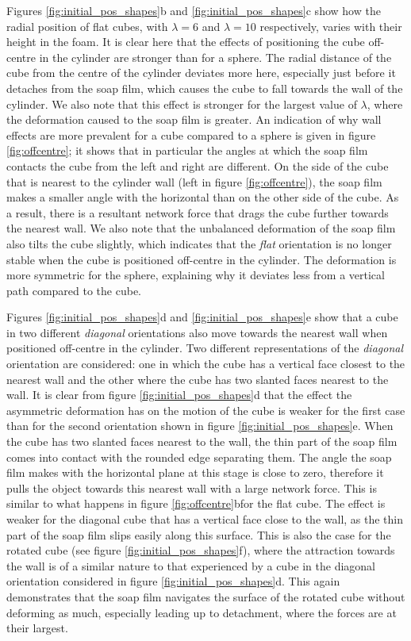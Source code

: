 \documentclass[preprint]{revtex4-1}
\begin{document}
Figures \ref{fig:initial_pos_shapes}b and \ref{fig:initial_pos_shapes}c show how the radial position of flat cubes, with $\lambda=6$ and $\lambda=10$ respectively, varies with their height in the foam. It is clear here that the effects of positioning the cube off-centre in the cylinder are stronger than for a sphere. The radial distance of the cube from the centre of the cylinder deviates more here, especially just before it detaches from the soap film, which causes the cube to fall towards the wall of the cylinder. We also note that this effect is stronger for the largest value of $\lambda$, where the deformation caused to the soap film is greater. An indication of why wall effects are more prevalent for a cube compared to a sphere is given in figure \ref{fig:offcentre}; it shows that in particular the angles at which the soap film contacts the cube from the left and right are different. On the side of the cube that is nearest to the cylinder wall (left in figure \ref{fig:offcentre}), the soap film makes a smaller angle with the horizontal than on the other side of the cube. As a result, there is a resultant network force that drags the cube further towards the nearest wall. We also note that the unbalanced deformation of the soap film also tilts the cube slightly, which indicates that the \emph{flat} orientation is no longer stable when the cube is positioned off-centre in the cylinder. The deformation is more symmetric for the sphere, explaining why it deviates less from a vertical path compared to the cube.


Figures \ref{fig:initial_pos_shapes}d and \ref{fig:initial_pos_shapes}e show that a cube in two different \emph{diagonal} orientations also move towards the nearest wall when positioned off-centre in the cylinder. Two different representations of the \emph{diagonal} orientation are considered: one in which the cube has a vertical face closest to the nearest wall and the other where the cube has two slanted faces nearest to the wall. It is clear from figure \ref{fig:initial_pos_shapes}d that the effect the asymmetric deformation has on the motion of the cube is weaker for the first case than for the second orientation shown in figure \ref{fig:initial_pos_shapes}e. When the cube has two slanted faces nearest to the wall, the thin part of the soap film comes into contact with the rounded edge separating them. The angle the soap film makes with the horizontal plane at this stage is close to zero, therefore it pulls the object towards this nearest wall with a large network force. This is similar to what happens in figure \ref{fig:offcentre}bfor the flat cube. The effect is weaker for the diagonal cube that has a vertical face close to the wall, as the thin part of the soap film slips easily along this surface. This is also the case for the rotated cube (see figure \ref{fig:initial_pos_shapes}f), where the attraction towards the wall is of a similar nature to that experienced by a cube in the diagonal orientation considered in figure \ref{fig:initial_pos_shapes}d. This again demonstrates that the soap film navigates the surface of the rotated cube without deforming as much, especially leading up to detachment, where the forces are at their largest. 
\end{document}
